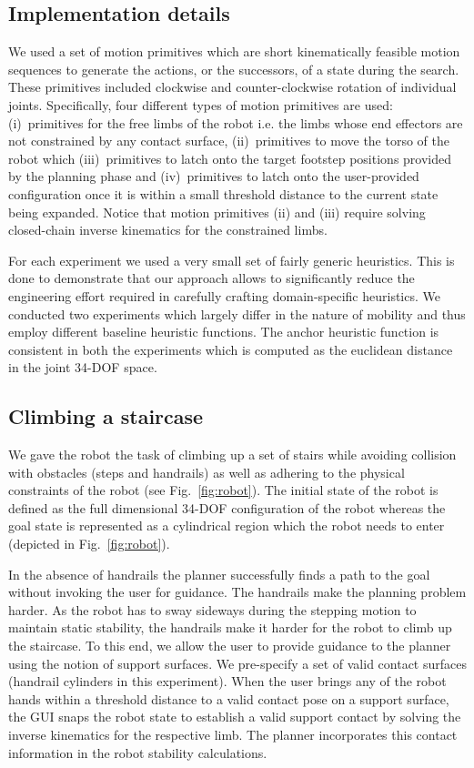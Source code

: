 \documentclass[conference]{IEEEtran}
\begin{document}
\subsection{Implementation details}
We used a set of motion primitives which are short kinematically feasible motion sequences to generate the actions, or the successors, of a state during the search. These primitives included clockwise and counter-clockwise rotation of individual joints. 
Specifically, four different types of motion primitives are used:
(i)~primitives for the free limbs of the robot i.e. the limbs whose end effectors are not constrained by any contact surface,  
(ii)~primitives to move the torso of the robot which 
(iii)~primitives to latch onto the target footstep positions provided by the planning phase
and
(iv)~primitives to latch onto the user-provided configuration once it is within a small threshold distance to the current state being expanded.
Notice that motion primitives (ii) and (iii) require solving closed-chain inverse kinematics for the constrained limbs.

For each experiment we used a very small set of fairly generic heuristics. 
This is done to demonstrate that our approach allows to significantly reduce the engineering effort required in carefully crafting domain-specific heuristics. 
We conducted two experiments which largely differ in the nature of mobility and thus employ different baseline heuristic functions. 
The anchor heuristic function is consistent in both the experiments which is computed as the euclidean distance in the joint 34-DOF space.

\subsection{Climbing a staircase}
\label{subsec:stairs}

We gave the robot the task of climbing up a set of stairs while avoiding collision with obstacles (steps and handrails) as well as adhering to the physical constraints of the robot (see Fig.~\ref{fig:robot}). The initial state of the robot is defined as the full dimensional 34-DOF configuration of the robot whereas the goal state is represented as a cylindrical region which the robot needs to enter (depicted in Fig.~\ref{fig:robot}).

In the absence of handrails the planner successfully finds a path to the goal without invoking the user for guidance. The handrails make the planning problem  harder. As the robot has to sway sideways during the stepping motion to maintain static stability, the handrails make it harder for the robot to climb up the staircase. 
To this end, we allow the user to provide guidance to the planner using the notion of support surfaces. 
We pre-specify a set of valid contact surfaces (handrail cylinders in this experiment). When the user brings any of the robot hands within a threshold distance to a valid contact pose on a support surface, the GUI snaps the robot state to establish a valid support contact by solving the inverse kinematics for the respective limb. The planner incorporates this contact information in the robot stability calculations.
\end{document}
